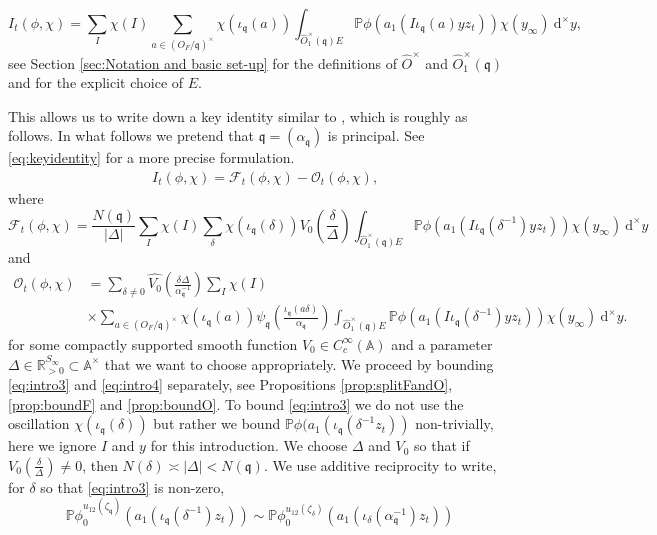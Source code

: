 \documentclass[a4paper,11pt]{amsart}
\theoremstyle{definition}
\newcommand{\A}{\mathbb{A}}
\newcommand{\R}{\mathbb{R}}
\begin{document}
\begin{equation*}\label{eq:intro2}I_t(\phi,\chi) = \sum_{I}\chi(I)\sum_{a\in (O_F/\mathfrak{q})^\times}\chi(\iota_\mathfrak{q}(a))\int_{\widehat O^\times_1(\mathfrak{q})E}\mathbb{P}\phi(a_1(I\iota_\mathfrak{q}(a)yz_t))\chi(y_\infty)\ \mathrm{d}^\times y,\end{equation*}
see Section \ref{sec:Notation and basic set-up} for the definitions of $\widehat O^\times$ and $\widehat O_1^\times(\mathfrak{q})$ and for the explicit choice of $E$.


This allows us to write down a key identity similar to \cite[(3.5)]{nelsonholowinsky}, which is roughly as follows. In what follows we pretend that $\mathfrak{q}=(\alpha_\mathfrak{q})$ is principal. See \eqref{eq:keyidentity} for a more precise formulation.
\begin{align*}
    &I_t(\phi,\chi) = \mathcal{F}_t(\phi,\chi) - \mathcal{O}_t(\phi,\chi), \end{align*}where 
    \begin{equation}\mathcal{F}_t(\phi,\chi)=\frac{N(\mathfrak{q})}{\vert\Delta\vert}\sum_{I}\chi(I)\sum_{\delta}\chi(\iota_\mathfrak{q}(\delta))V_0\left(\frac{\delta}{\Delta}\right)\int_{\widehat{O}_1^\times(\mathfrak{q})E}\mathbb P\phi(a_1(I\iota_\mathfrak{q}(\delta^{-1})yz_t))\chi(y_\infty) \ \mathrm{d}^\times y\label{eq:intro3}\end{equation}and  \begin{align}
        \mathcal{O}_t(\phi,\chi)&=\sum_{\delta \neq 0}\widehat{V_0}\left(\frac{\delta\Delta}{\alpha_\mathfrak{q}^{-1}}\right)\sum_{I}\chi(I)\nonumber\\&\times\sum_{a\in (O_F/\mathfrak{q})^\times}\chi(\iota_\mathfrak{q}(a))\psi_\mathfrak{q}\left(\frac{\iota_\mathfrak{q}(a\delta)}{\alpha_\mathfrak{q}}\right)\int_{\widehat{O}^\times_1(\mathfrak{q}) E} \mathbb P\phi(a_1(I\iota_\mathfrak{q}(\delta^{-1})yz_t))\chi(y_\infty) \ \mathrm{d}^\times y. \label{eq:intro4}
\end{align}
for some compactly supported smooth function $V_0\in C_c^\infty(\A)$ and a parameter $\Delta \in \R^{S_\infty}_{>0}\subset \A^\times$ that we want to choose appropriately. We proceed by bounding \eqref{eq:intro3} and \eqref{eq:intro4} separately, see Propositions \ref{prop:splitFandO}, \ref{prop:boundF} and \ref{prop:boundO}.  To bound \eqref{eq:intro3} we do not use the oscillation $\chi(\iota_\mathfrak{q}(\delta))$ but rather we bound $\mathbb{P}\phi(a_1(\iota_\mathfrak{q}(\delta^{-1}z_t))$ non-trivially, here we ignore $I$ and $y$ for this introduction. We choose $\Delta$ and $V_0$ so that if $V_0\left(\frac{\delta}{\Delta}\right)\neq0$, then $N(\delta) \asymp \vert \Delta \vert < N(\mathfrak{q})$. We use additive reciprocity to write, for $\delta$ so that \eqref{eq:intro3} is non-zero, \[\mathbb P\phi_0^{u_{12}(\zeta_\mathfrak{q})}(a_1(\iota_\mathfrak{q}(\delta^{-1})z_t)) \sim \mathbb{P}\phi_0^{u_{12}(\zeta_\delta)}(a_1(\iota_\delta(\alpha_\mathfrak{q}^{-1})z_t))\]
\end{document}
